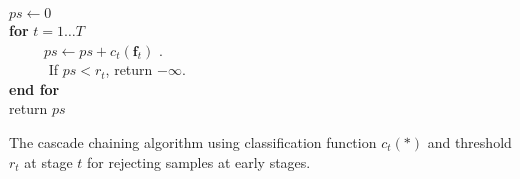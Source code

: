 \documentclass[10pt,twocolumn,letterpaper]{article}
\begin{document}

\begin{algorithm}[b]
$ps \leftarrow 0$\\
\textbf{for} $t=1 \ldots T$ \\
 ~~~~~$ps \leftarrow  ps +  c_t(\mathbf{f}_t)$ . \\
 ~~~~~ If $ps<r_t$,  return $-\infty$.  \\
\textbf{end for}\\
return $ps$
  \caption{The cascade chaining algorithm using classification function $c_t(*)$  and threshold $r_t$ at stage $t$ for rejecting samples at early stages.}
\label{alg:cascade}
\end{algorithm}
\end{document}
